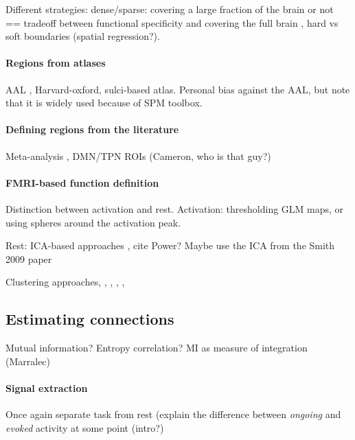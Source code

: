 \documentclass[5p]{elsarticle}
\begin{document}
Different strategies: 
dense/sparse: covering a large fraction of the
brain or not == tradeoff between functional specificity and covering the
full brain
, hard vs soft boundaries (spatial regression?).

\paragraph{Regions from atlases}

AAL \cite{tzourio-mazoyer2002a}, Harvard-oxford, sulci-based atlas.
Personal bias against the AAL, but note that it is widely used because of
SPM toolbox.

\paragraph{Defining regions from the literature}
Meta-analysis \cite{dosenbach}, DMN/TPN ROIs (Cameron, who is that guy?)

\paragraph{FMRI-based function definition}
Distinction between activation and rest.
Activation: thresholding GLM maps, or using spheres around the activation
peak.

Rest: ICA-based approaches \cite{kiviniemi2009} \cite{shirer2012}
\cite{varoquaux2011} \cite{yeo}, cite Power?
Maybe use the ICA from the Smith 2009 paper

Clustering approaches, \cite{craddock2011}, \cite{bellec}, \cite{flandin}, \cite{poline}, \cite{thirion}

\subsection{Estimating connections}

Mutual information? Entropy correlation? MI as measure of integration (Marralec)

\paragraph{Signal extraction}

Once again separate task from rest (explain the difference between
\emph{ongoing} and \emph{evoked} activity at some point (intro?)
\end{document}
